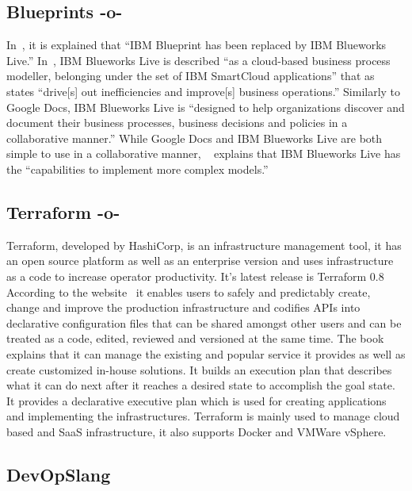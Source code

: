 \subsection{Blueprints -o-}

In~\cite{www-blueprints}, it is explained that ``IBM Blueprint has
been replaced by IBM Blueworks Live.'' In~\cite{www-blueworks-live2},
IBM Blueworks Live is described ``as a cloud-based business process
modeller, belonging under the set of IBM SmartCloud applications''
that as~\cite{www-blueworks-live} states ``drive[s] out
inefficiencies and improve[s] business operations.'' Similarly to
Google Docs, IBM Blueworks Live is ``designed to help organizations
discover and document their business processes, business decisions and
policies in a collaborative manner.'' While Google Docs and IBM
Blueworks Live are both simple to use in a collaborative manner,
~\cite{www-blueworks-live2} explains that IBM Blueworks Live has the
``capabilities to implement more complex models.''

\subsection{Terraform -o-}

Terraform, developed by HashiCorp, is an infrastructure management
tool, it has an open source platform as well as an enterprise version
and uses infrastructure as a code to increase operator
productivity. It's latest release is Terraform 0.8 According to the
website~\cite{www-Terraform} it enables users to safely and
predictably create, change and improve the production infrastructure
and codifies APIs into declarative configuration files that can be
shared amongst other users and can be treated as a code, edited,
reviewed and versioned at the same time. The
book~\cite{www-terraform-book} explains that it can manage the
existing and popular service it provides as well as create customized
in-house solutions. It builds an execution plan that describes what it
can do next after it reaches a desired state to accomplish the goal
state. It provides a declarative executive plan which is used for
creating applications and implementing the infrastructures. Terraform
is mainly used to manage cloud based and SaaS infrastructure, it also
supports Docker and VMWare vSphere.
     
\subsection{DevOpSlang}
     
